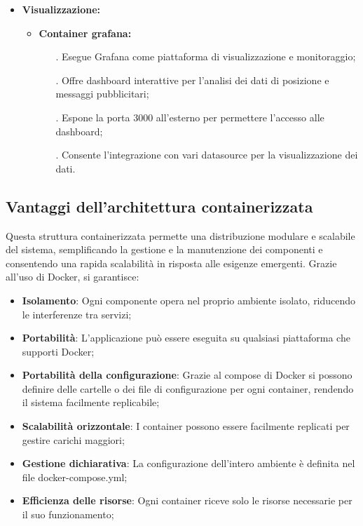 \documentclass[10pt]{article}
\begin{document}
\begin{itemize}
    \item \textbf{Visualizzazione:}
    \begin{itemize}
        \item \textbf{Container grafana:}
        \begin{itemize}
            \item[.] Esegue Grafana come piattaforma di visualizzazione e monitoraggio;
            \item[.] Offre dashboard interattive per l'analisi dei dati di posizione e messaggi pubblicitari;
            \item[.] Espone la porta 3000 all'esterno per permettere l'accesso alle dashboard;
            \item[.] Consente l'integrazione con vari datasource per la visualizzazione dei dati.
        \end{itemize}
    \end{itemize}
\end{itemize}

\subsection{Vantaggi dell'architettura containerizzata}
Questa struttura containerizzata permette una distribuzione modulare e scalabile del sistema, semplificando la gestione e la manutenzione dei componenti e consentendo una rapida scalabilità in risposta alle esigenze emergenti. Grazie all'uso di Docker, si garantisce:

\begin{itemize}
    \item \textbf{Isolamento}: Ogni componente opera nel proprio ambiente isolato, riducendo le interferenze tra servizi;
    \item \textbf{Portabilità}: L'applicazione può essere eseguita su qualsiasi piattaforma che supporti Docker;
    \item \textbf{Portabilità della configurazione}: Grazie al compose di Docker si possono definire delle cartelle o dei file di configurazione per ogni container, rendendo il sistema facilmente replicabile;
    \item \textbf{Scalabilità orizzontale}: I container possono essere facilmente replicati per gestire carichi maggiori;
    \item \textbf{Gestione dichiarativa}: La configurazione dell'intero ambiente è definita nel file docker-compose.yml;
    \item \textbf{Efficienza delle risorse}: Ogni container riceve solo le risorse necessarie per il suo funzionamento;
\end{itemize}
\end{document}
